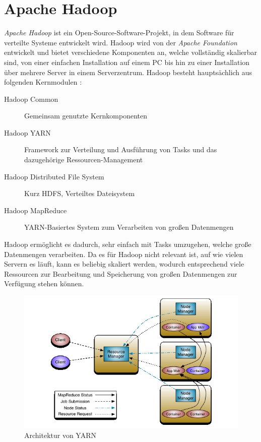 \section{Apache Hadoop}\label{sec:hadoop}

\emph{Apache Hadoop} ist ein Open-Source-Software-Projekt, in dem Software für verteilte Systeme entwickelt wird. Hadoop wird von der \emph{Apache Foundation} entwickelt und bietet verschiedene Komponenten an, welche vollständig skalierbar sind, von einer einfachen Installation auf einem PC bis hin zu einer Installation über mehrere Server in einem Serverzentrum. Hadoop besteht hauptsächlich aus folgenden Kernmodulen \cite{HadoopHomePage}:

\begin{description}
	\item[Hadoop Common] Gemeinsam genutzte Kernkomponenten
	\item[Hadoop YARN] Framework zur Verteilung und Ausführung von Tasks und das dazugehörige Ressourcen-Management
	\item[Hadoop Distributed File System] Kurz HDFS, Verteiltes Dateisystem
	\item[Hadoop MapReduce] YARN-Basiertes System zum Verarbeiten von großen Datenmengen
\end{description}

Hadoop ermöglicht es dadurch, sehr einfach mit Tasks umzugehen, welche große Datenmengen verarbeiten. Da es für Hadoop nicht relevant ist, auf wie vielen Servern es läuft, kann es beliebig skaliert werden, wodurch entsprechend viele Ressourcen zur Bearbeitung und Speicherung von großen Datenmengen zur Verfügung stehen können.

\begin{figure}
	\centering
	\includegraphics[width=\columnwidth]{./images/yarn_architecture.png}
	\caption[Architektur von YARN]{Architektur von YARN \cite{HadoopYarnDesc272}}
	\label{fig:yarnarch}
\end{figure}

